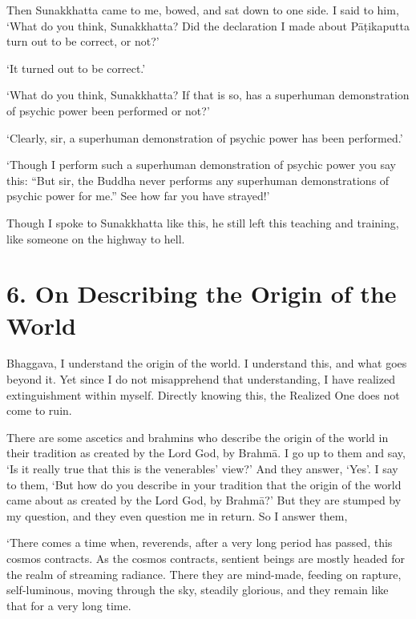 \documentclass[12pt,openany]{book}%
\begin{document}
Then Sunakkhatta came to me, bowed, and sat down to one side. I said to him, ‘What do you think, Sunakkhatta? Did the declaration I made about \textsanskrit{Pāṭikaputta} turn out to be correct, or not?’ 

‘It turned out to be correct.’ 

‘What do you think, Sunakkhatta? If that is so, has a superhuman demonstration of psychic power been performed or not?’ 

‘Clearly, sir, a superhuman demonstration of psychic power has been performed.’ 

‘Though I perform such a superhuman demonstration of psychic power you say this: “But sir, the Buddha never performs any superhuman demonstrations of psychic power for me.” See how far you have strayed!’ 

Though I spoke to Sunakkhatta like this, he still left this teaching and training, like someone on the highway to hell. 

\section*{6. On Describing the Origin of the World }

Bhaggava, I understand the origin of the world. I understand this, and what goes beyond it. Yet since I do not misapprehend that understanding, I have realized extinguishment within myself. Directly knowing this, the Realized One does not come to ruin. 

There are some ascetics and brahmins who describe the origin of the world in their tradition as created by the Lord God, by \textsanskrit{Brahmā}. I go up to them and say, ‘Is it really true that this is the venerables’ view?’ And they answer, ‘Yes’. I say to them, ‘But how do you describe in your tradition that the origin of the world came about as created by the Lord God, by \textsanskrit{Brahmā}?’ But they are stumped by my question, and they even question me in return. So I answer them, 

‘There comes a time when, reverends, after a very long period has passed, this cosmos contracts. As the cosmos contracts, sentient beings are mostly headed for the realm of streaming radiance. There they are mind-made, feeding on rapture, self-luminous, moving through the sky, steadily glorious, and they remain like that for a very long time. 
\end{document}
